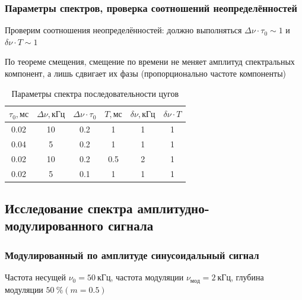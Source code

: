 \documentclass[a4paper, 12pt]{article}
\begin{document}
            \subsubsection{Параметры спектров, проверка соотношений неопределённостей}

                Проверим соотношения неопределённостей: должно выполняться $\Delta \nu \cdot \tau_0 \sim 1$ и $\delta \nu \cdot T \sim 1$

                По теореме смещения, смещение по времени не меняет амплитуд спектральных компонент, а лишь сдвигает их фазы (пропорционально частоте компоненты)

                \begin{table}[!ht]
                    \centering
                    \begin{tabular}{|c|c|c|c|c|c|}
                        \hline

                        $\tau_0, мс$ & $\Delta \nu, кГц$ & $\Delta \nu \cdot \tau_0$ & $T, мс$ & $\delta \nu, кГц$ & $\delta \nu \cdot T$\\ \hline
                        0.02 & 10 & 0.2 & 1 & 1 & 1\\ \hline
                        0.04 & 5 & 0.2 & 1 & 1 & 1\\ \hline
                        0.02 & 10 & 0.2 & 0.5 & 2 & 1\\ \hline
                        0.02 & 5 & 0.1 & 1 & 1 & 1\\ \hline

                    \end{tabular}
                    \caption{Параметры спектра последовательности цугов}
                    \label{tab:B.14}
                \end{table}

        \setcounter{subsection}{3}
        \subsection{Исследование спектра амплитудно-модулированного сигнала}

            \setcounter{subsubsection}{18}
            \subsubsection{Модулированный по амплитуде синусоидальный сигнал}

                Частота несущей $\nu_0 = 50~кГц$, частота модуляции $\nu_{мод} = 2~кГц$, глубина модуляции $50~\% (m = 0.5)$
\end{document}
